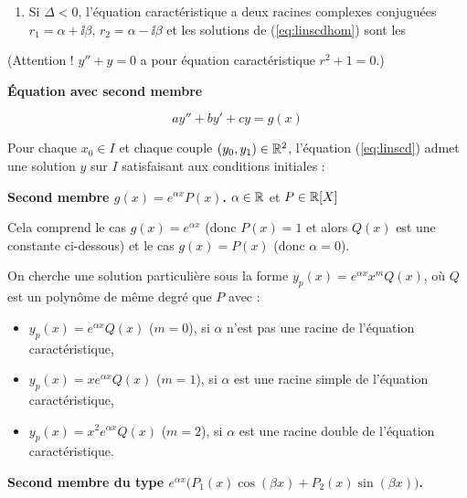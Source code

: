 \documentclass[10pt,class=article,crop=false]{standalone}
\begin{document}
\begin{multicols}{2}
\begin{theoreme}
\begin{enumerate}
		\item Si $\Delta<0$, l'équation caractéristique a deux racines complexes
		conjuguées $r_1=\alpha+\ii \beta$, $r_2=\alpha-\ii \beta$ et les solutions de (\ref{eq:linscdhom}) sont les
		
	\end{enumerate}
\end{theoreme}

(Attention ! $y''+y=0$ a pour équation caractéristique $r^2+1=0$.)

\textbf{Équation avec second membre}


\begin{equation}
	ay''+by'+cy=g(x)
	\tag{$E$}
\end{equation}

\begin{theoreme}
	Pour chaque $x_0\in I$ et chaque couple $(y_0,y_1) \in \mathbb{R}^2$,
	l'équation (\ref{eq:linscd}) admet une 
	solution $y$ sur $I$ satisfaisant aux conditions initiales :
\end{theoreme}



\textbf{Second membre $g(x)=e^{\alpha x}P(x)$.} $\alpha \in \mathbb{R}$ et $P\in \mathbb{R}[X]$

Cela comprend le cas $g(x) = e^{\alpha x}$ (donc $P(x)=1$ et alors $Q(x)$ est une constante ci-dessous) et le cas $g(x) = P(x)$ (donc $\alpha=0$).

On cherche une solution particulière sous la forme
$y_p(x)=e^{\alpha x}x^{m}Q(x)$, où $Q$ est un polynôme de
même degré que $P$ avec :
\begin{itemize}
	\item $y_p(x)=e^{\alpha x}Q(x)$ ($m=0$), si $\alpha$ n'est pas une racine de l'équation caractéristique,
	\item $y_p(x)=xe^{\alpha x}Q(x)$ ($m=1$), si $\alpha$ est une racine simple de l'équation caractéristique,
	\item $y_p(x)=x^2e^{\alpha x}Q(x)$ ($m=2$), si $\alpha$ est une racine double de l'équation caractéristique.
\end{itemize}

\textbf{Second membre du type $e^{\alpha x}\big(P_1(x)\cos (\beta x)+P_2(x)\sin (\beta x)\big)$.}


\end{multicols}
\end{document}
